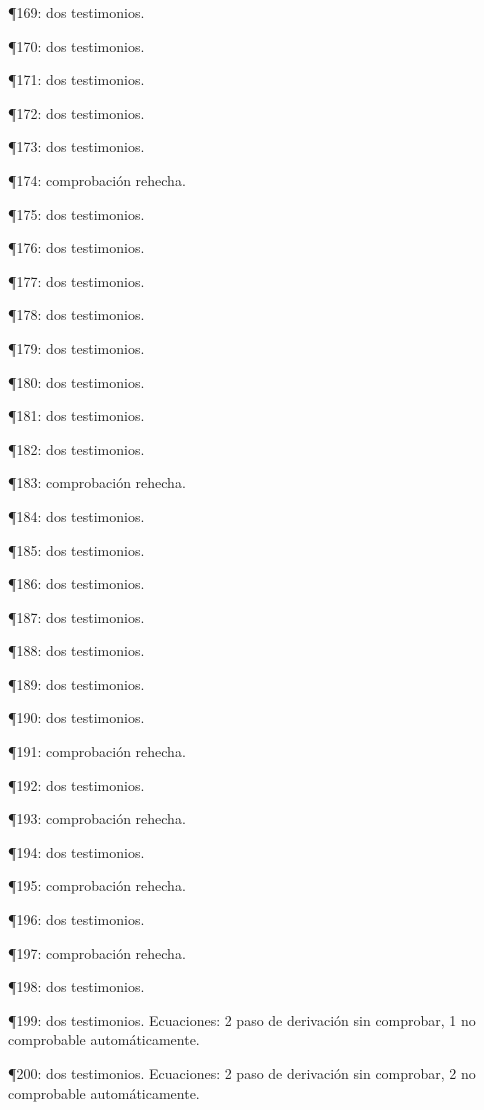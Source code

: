 \documentclass[10pt,openany]{book}
\begin{document}
\noindent ¶169: dos testimonios.\par
\noindent ¶170: dos testimonios.\par
\noindent ¶171: dos testimonios.\par
\noindent ¶172: dos testimonios.\par
\noindent ¶173: dos testimonios.\par
\noindent ¶174: comprobación rehecha.\par
\noindent ¶175: dos testimonios.\par
\noindent ¶176: dos testimonios.\par
\noindent ¶177: dos testimonios.\par
\noindent ¶178: dos testimonios.\par
\noindent ¶179: dos testimonios.\par
\noindent ¶180: dos testimonios.\par
\noindent ¶181: dos testimonios.\par
\noindent ¶182: dos testimonios.\par
\noindent ¶183: comprobación rehecha.\par
\noindent ¶184: dos testimonios.\par
\noindent ¶185: dos testimonios.\par
\noindent ¶186: dos testimonios.\par
\noindent ¶187: dos testimonios.\par
\noindent ¶188: dos testimonios.\par
\noindent ¶189: dos testimonios.\par
\noindent ¶190: dos testimonios.\par
\noindent ¶191: comprobación rehecha.\par
\noindent ¶192: dos testimonios.\par
\noindent ¶193: comprobación rehecha.\par
\noindent ¶194: dos testimonios.\par
\noindent ¶195: comprobación rehecha.\par
\noindent ¶196: dos testimonios.\par
\noindent ¶197: comprobación rehecha.\par
\noindent ¶198: dos testimonios.\par
\noindent ¶199: dos testimonios. Ecuaciones: 2 paso de derivación sin comprobar, 1 no comprobable automáticamente.\par
\noindent ¶200: dos testimonios. Ecuaciones: 2 paso de derivación sin comprobar, 2 no comprobable automáticamente.\par
\end{document}
